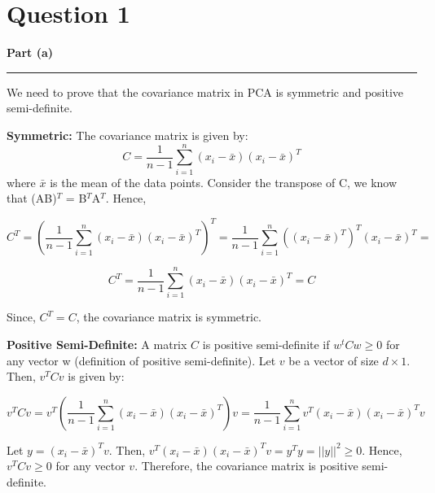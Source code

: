 \documentclass[a4paper,12pt]{article}
\title{\cooltitle{CS663 Assignment-4}}
\author{{\bf Saksham Rathi, Kavya Gupta, Shravan Srinivasa Raghavan} \\
\small Department of Computer Science, \\
Indian Institute of Technology Bombay \\}
\date{}
\newenvironment{solution}[2][]{%
    \begin{mdframed}[linecolor=blue!70!black, linewidth=2pt, roundcorner=10pt, backgroundcolor=yellow!10!white, skipabove=12pt, skipbelow=12pt]%
        \textbf{\large #2}
        \par\noindent\rule{\textwidth}{0.4pt}
}{
    \end{mdframed}
}
\begin{document}
\maketitle

\section*{Question 1}

\begin{solution}{Part (a)}
We need to prove that the covariance matrix in PCA is symmetric and positive semi-definite.

\textbf{Symmetric:} The covariance matrix is given by:
\begin{equation}
  C = \frac{1}{n-1} \sum_{i=1}^{n} (x_i - \bar{x})(x_i - \bar{x})^T
\end{equation}
where $\bar{x}$ is the mean of the data points. Consider the transpose of C, we know that (AB)$^T$ = B$^T$A$^T$. Hence,

\begin{equation}
  C^T = \left(\frac{1}{n-1} \sum_{i=1}^{n} (x_i - \bar{x})(x_i - \bar{x})^T\right)^T = \frac{1}{n-1} \sum_{i=1}^{n} ((x_i - \bar{x})^T)^T(x_i - \bar{x})^T = 
\end{equation}

\begin{equation}
  C^T = \frac{1}{n-1} \sum_{i=1}^{n} (x_i - \bar{x})(x_i - \bar{x})^T = C
\end{equation}

Since, $C^T = C$, the covariance matrix is symmetric.

\textbf{Positive Semi-Definite:} A matrix $C$ is positive semi-definite if $w^tCw \geq 0$ for any vector w (definition of positive semi-definite). Let $v$ be a vector of size $d \times 1$. Then, $v^TCv$ is given by:

\begin{equation}
  v^TCv = v^T\left(\frac{1}{n-1} \sum_{i=1}^{n} (x_i - \bar{x})(x_i - \bar{x})^T\right)v = \frac{1}{n-1} \sum_{i=1}^{n} v^T(x_i - \bar{x})(x_i - \bar{x})^Tv
\end{equation}

Let $y = (x_i - \bar{x})^Tv$. Then, $v^T(x_i - \bar{x})(x_i - \bar{x})^Tv = y^Ty = ||y||^2 \geq 0$. Hence, $v^TCv \geq 0$ for any vector $v$. Therefore, the covariance matrix is positive semi-definite.
\end{solution}
\end{document}
